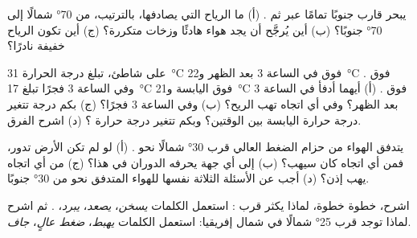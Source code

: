 \begin{exercise}[$\star\star$]\label{exo:g8:winds-global-circulation:6}
يبحر قارب جنوبًا تمامًا عبر  ثم . (أ) ما
الرياح التي يصادفها، بالترتيب، من \ang{70} شمالًا إلى \ang{70} جنوبًا؟
(ب) أين يُرجَّح أن يجد هواء هادئًا وزخات متكررة؟ (ج) أين تكون الرياح
خفيفة  نادرًا؟
\end{exercise}

\begin{exercise}[$\star\star$]\label{exo:g8:winds-global-circulation:7}
على شاطئ، تبلغ درجة الحرارة \qty{31}{\degreeCelsius} فوق  في الساعة 3
بعد الظهر و\qty{22}{\degreeCelsius} فوق . وفي الساعة 3 فجرًا تبلغ
\qty{17}{\degreeCelsius} فوق اليابسة و\qty{21}{\degreeCelsius} فوق
. (أ) أيهما أدفأ في الساعة 3 بعد الظهر؟ وفي أي اتجاه تهب الريح؟
(ب) وفي الساعة 3 فجرًا؟ (ج) بكم درجة تتغير درجة حرارة اليابسة بين الوقتين؟
وبكم تتغير درجة حرارة ؟ (د) اشرح الفرق.
\end{exercise}

\begin{exercise}[$\star\star$]\label{exo:g8:winds-global-circulation:8}
يتدفق الهواء من حزام الضغط العالي قرب \ang{30} شمالًا نحو .
(أ) لو لم تكن الأرض تدور، فمن أي اتجاه كان سيهب؟ (ب) إلى أي جهة يحرفه
الدوران في  هذا؟ (ج) من أي اتجاه يهب إذن؟ (د) أجب عن الأسئلة
الثلاثة نفسها للهواء المتدفق نحو  من \ang{30} جنوبًا.
\end{exercise}

\begin{exercise}[$\star\star$]\label{exo:g8:winds-global-circulation:9}
اشرح، خطوة خطوة، لماذا يكثر  قرب :
استعمل الكلمات \emph{يسخن}، \emph{يصعد}، \emph{يبرد}، \emph{}.
ثم اشرح لماذا توجد  قرب \ang{25} شمالًا في شمال إفريقيا: استعمل
الكلمات \emph{يهبط}، \emph{ضغط عالٍ}، \emph{جاف}.
\end{exercise}

